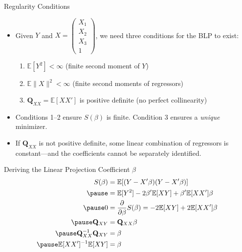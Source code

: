 \documentclass[aspectratio=169]{beamer}
\numberwithin{equation}{section}
\begin{document}
\begin{frame}{Regularity Conditions}
\begin{itemize}
\item Given $Y$ and $X=\begin{pmatrix} X_1\\ X_2\\X_3\\1 \end{pmatrix}$, we need three conditions for the BLP to exist:
\begin{enumerate}
\item $\mathbb{E}[Y^2]<\infty$ \hfill (finite second moment of $Y$)
\item $\mathbb{E}\|X\|^2<\infty$ \hfill (finite second moments of regressors)
\item $\mathbf{Q}_{XX}=\mathbb{E}[XX']$ is positive definite \hfill (no perfect collinearity)
\end{enumerate}\pause
\bigskip
\item Conditions 1--2 ensure $S(\beta)$ is finite.  Condition 3 ensures a \emph{unique} minimizer.
\item If $\mathbf{Q}_{XX}$ is not positive definite, some linear combination of regressors is constant---and the coefficients cannot be separately identified.
\end{itemize}
\end{frame}



\begin{frame}{Deriving the Linear Projection Coefficient $\beta$}
\begin{align*}
S(\beta)&=\mathbb{E}[(Y-X'\beta)(Y-X'\beta)]\\\pause
&=\mathbb{E}[Y^2]-2\beta'\mathbb{E}[XY]+\beta'\mathbb{E}[XX']\beta\\\pause
0&=\frac{\partial}{\partial \beta} S(\beta)=-2\mathbb{E}[XY]+2\mathbb{E}[XX']\beta\\\pause
\mathbf{Q}_{XY}&=\mathbf{Q}_{XX}\beta\\\pause
\mathbf{Q}_{XX}^{-1}\mathbf{Q}_{XY}&=\beta\\\pause
\mathbb{E}[XX']^{-1}\mathbb{E}[XY]&=\beta
\end{align*}
\end{frame}
\end{document}
